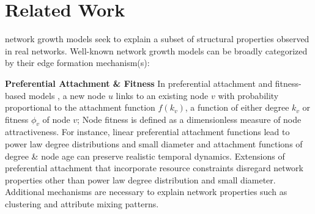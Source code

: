 \section{Related Work}
\label{sec:Related Work}
network growth models seek to explain a subset of structural properties observed in real
networks. Well-known network growth models can be broadly categorized by their
edge formation mechanism(s):

\textbf{Preferential Attachment \& Fitness}
In preferential attachment and fitness-based models \cite{bell2017network,medo2011temporal,bianconi2001bose,caldarelli2002scale}, a new node $u$ links to an existing node $v$
with probability proportional to the attachment function $f(k_v)$, a function of
either degree $k_v$ or fitness $\phi_v$ of node $v$; Node fitness is defined as a dimensionless
measure of node attractiveness.
For instance, linear preferential attachment functions
\cite{barabasi1999emergence,kumar2000stochastic,dorogovtsev2000structure} lead to
power law degree distributions and small diameter \cite{bollobas2004diameter}
and attachment functions of degree \& node age \cite{wang2013quantifying}
can preserve realistic temporal dynamics.
Extensions of preferential
attachment \cite{mossa2002truncation,zeng2005construction,wang2009local} that
incorporate resource constraints
disregard network properties other than power law degree distribution and small diameter.
Additional mechanisms are necessary to explain network properties
such as clustering and attribute mixing patterns.


